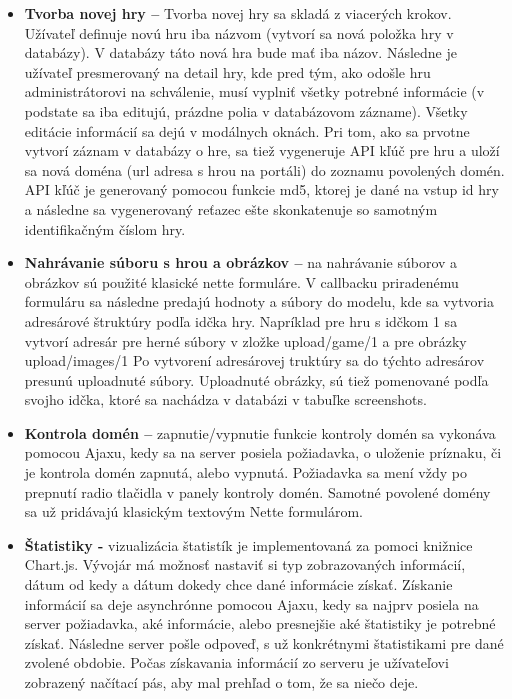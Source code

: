 \begin{itemize}  
\item \textbf{Tvorba novej hry –} Tvorba novej hry sa skladá z viacerých krokov. Užívateľ definuje novú hru iba názvom (vytvorí sa nová položka hry v databázy). V databázy táto nová hra bude mať iba názov. Následne je užívateľ presmerovaný na detail hry, kde pred tým, ako odošle hru administrátorovi na schválenie, musí vyplniť všetky potrebné informácie (v podstate sa iba editujú, prázdne polia v databázovom zázname). Všetky editácie informácií sa dejú v modálnych oknách. Pri tom, ako sa prvotne vytvorí záznam v databázy o hre, sa tiež vygeneruje API kľúč pre hru a uloží sa nová doména (url adresa s hrou na portáli) do zoznamu povolených domén. API kľúč je generovaný pomocou funkcie md5, ktorej je dané na vstup id hry a následne sa vygenerovaný reťazec ešte skonkatenuje so samotným identifikačným číslom hry.  
\item \textbf{Nahrávanie súboru s hrou a obrázkov –} na nahrávanie súborov a obrázkov sú použité klasické nette formuláre. V callbacku priradenému formuláru sa následne predajú hodnoty a súbory do modelu, kde sa vytvoria adresárové štruktúry podľa idčka hry. Napríklad pre hru s idčkom 1 sa vytvorí adresár pre herné súbory v zložke upload/game/1 a pre obrázky upload/images/1 Po vytvorení adresárovej truktúry sa do týchto adresárov presunú uploadnuté súbory. Uploadnuté obrázky, sú tiež pomenované podľa svojho idčka, ktoré sa nachádza v databázi v tabuľke screenshots.
\item \textbf{Kontrola domén –} zapnutie/vypnutie funkcie kontroly domén sa vykonáva pomocou Ajaxu, kedy sa na server posiela požiadavka, o uloženie príznaku, či je kontrola domén zapnutá, alebo vypnutá. Požiadavka sa mení vždy po prepnutí radio tlačidla v panely kontroly domén. Samotné povolené domény sa už pridávajú klasickým textovým Nette formulárom.  
\item \textbf{Štatistiky -} vizualizácia štatistík je implementovaná za pomoci knižnice Chart.js. Vývojár má možnosť nastaviť si typ zobrazovaných informácií, dátum od kedy a dátum dokedy chce dané informácie získať. Získanie informácií sa deje asynchrónne pomocou Ajaxu, kedy sa najprv posiela na server požiadavka, aké informácie, alebo presnejšie aké štatistiky je potrebné získať. Následne server pošle odpoveď, s už konkrétnymi štatistikami pre dané zvolené obdobie. Počas získavania informácií zo serveru je užívateľovi zobrazený načítací pás, aby mal prehľad o tom, že sa niečo deje. 
\end{itemize} 

